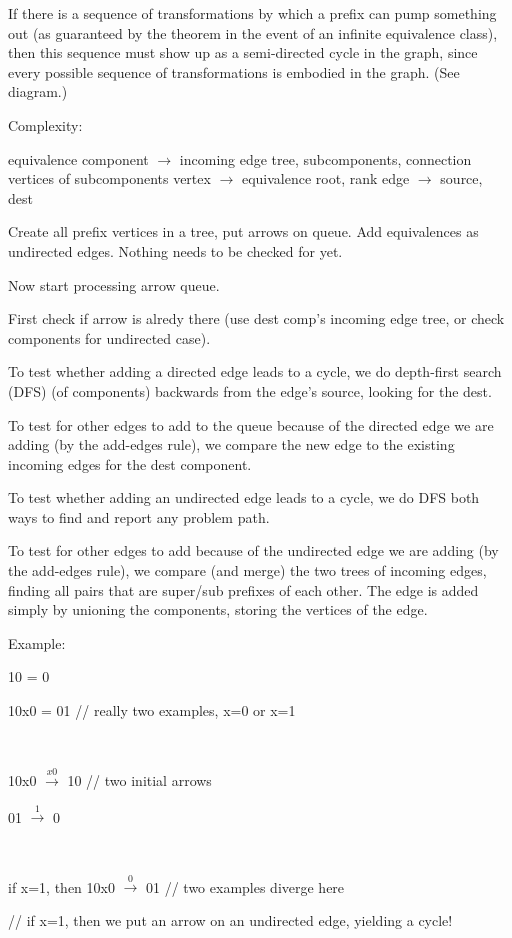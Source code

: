 \documentclass{book}
\begin{document}
If there is a sequence of transformations by which a prefix can pump something out (as guaranteed by the theorem in the event of an infinite equivalence class), then this sequence must show up as a semi-directed cycle in the graph, since every possible sequence of transformations is embodied in the graph.  (See diagram.)


Complexity:

equivalence component $\longrightarrow$ incoming edge tree, subcomponents, connection vertices of subcomponents
vertex $\longrightarrow$ equivalence root, rank
edge $\longrightarrow$ source, dest

Create all prefix vertices in a tree, put arrows on queue.
Add equivalences as undirected edges.  Nothing needs to be checked for yet.

Now start processing arrow queue.

First check if arrow is alredy there (use dest comp's incoming edge tree, or check components for undirected case).

To test whether adding a directed edge leads to a cycle, we do depth-first search (DFS) (of components) backwards from the edge's source, looking for the dest.

To test for other edges to add to the queue because of the directed edge we are adding (by the add-edges rule), we compare the new edge to the existing incoming edges for the dest component.

To test whether adding an undirected edge leads to a cycle, we do DFS both ways to find and report any problem path.

To test for other edges to add because of the undirected edge we are adding (by the add-edges rule), we compare (and merge) the two trees of incoming edges, finding all pairs that are super/sub prefixes of each other.
The edge is added simply by unioning the components, storing the vertices of the edge.


Example:

10 = 0

10x0 = 01       // really two examples, x=0 or x=1

~

10x0 $\stackrel{x0}\longrightarrow$ 10   // two initial arrows

01 $\stackrel{1}\longrightarrow$ 0

~

if x=1, then 10x0 $\stackrel{0}\longrightarrow$ 01   // two examples diverge here

// if x=1, then we put an arrow on an undirected edge, yielding a cycle!
\end{document}
